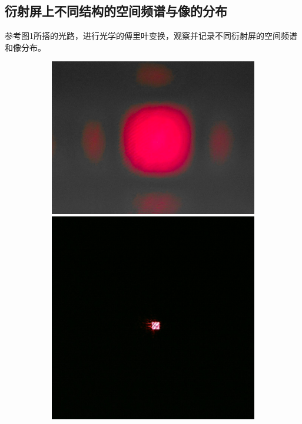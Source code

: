 \documentclass[a4paper]{article}
\begin{document}
\subsection{衍射屏上不同结构的空间频谱与像的分布}
\hspace{2em}参考图1所搭的光路，进行光学的傅里叶变换，观察并记录不同衍射屏的空间频谱和像分布。\par
\begin{figure}[H]
    \centering
    \begin{subfigure}[t]{0.3\textwidth}
        \centering
        \includegraphics[width=\textwidth]{fre-done/1-1.JPG}
        \includegraphics[width=\textwidth]{img-done/1-1.JPG}

\end{subfigure}
\end{figure}
\end{document}
